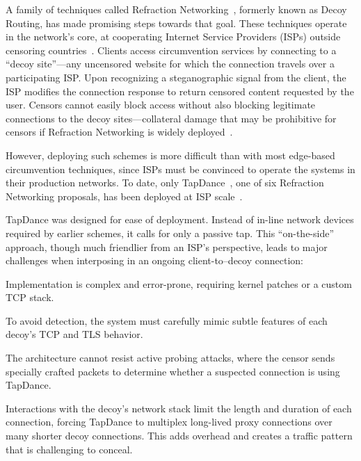 \documentclass[sigconf]{acmart}
\begin{document}

A family of techniques called Refraction Networking~\cite{telex11,cirripede11,curveball11,tapdance14,rebound15,slitheen16,waterfall17}, formerly known
as Decoy Routing, has made promising steps towards that goal.
These techniques operate in the network's core, at cooperating Internet Service Providers
(ISPs) outside censoring countries~\cite{refraction-site}.  Clients access circumvention services by connecting to a ``decoy site''---any uncensored website for which the connection travels over a participating ISP\@.  Upon recognizing a steganographic signal from the client, the ISP modifies the connection response to return censored content requested by the user.
Censors cannot easily block access without also blocking legitimate connections to the decoy sites---collateral damage that may be prohibitive for censors if Refraction Networking is widely deployed~\cite{robinson2013collateral}.

However, deploying such schemes is more difficult than with most
edge-based circumvention techniques, since ISPs must be convinced to
operate the systems in their production networks.  To date, only
TapDance~\cite{tapdance14}, one of six Refraction Networking
proposals, has been deployed at ISP scale~\cite{frolov2017isp}.

TapDance was designed for ease of deployment.
Instead of in-line network devices required by earlier schemes, it
calls for only a passive tap.
This ``on-the-side'' approach, though much friendlier from an ISP's
perspective, leads to major challenges when interposing in an ongoing
client-to--decoy connection:
\begin{compactitem}
\item Implementation is complex and error-prone, requiring kernel
  patches or a custom TCP stack.
\item To avoid detection, the system must carefully mimic
  subtle features of each decoy's TCP and TLS behavior.
\item The architecture cannot resist active probing attacks, where the
  censor sends specially crafted packets to determine whether a
  suspected connection is using TapDance.
\item Interactions with the decoy's network stack limit the length and
  duration of each connection, forcing TapDance to multiplex
  long-lived proxy connections over many shorter decoy
  connections. This adds overhead and creates a traffic pattern
  that is challenging to conceal.
\end{compactitem}
\end{document}
